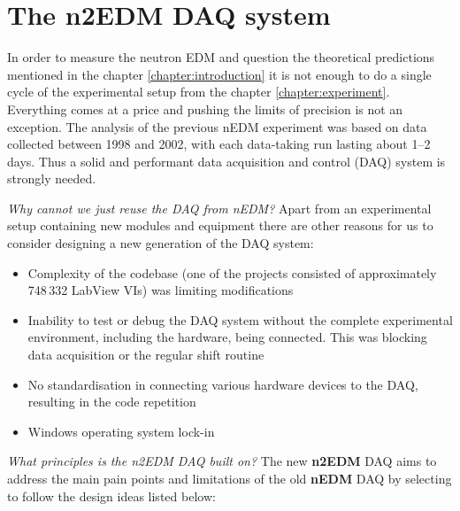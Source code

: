 \chapter{The n2EDM DAQ system}
\label{chapter:daq}

In order to measure the neutron EDM and question the theoretical predictions mentioned in the chapter \ref{chapter:introduction} it is not enough to do a single cycle of the experimental setup from the chapter \ref{chapter:experiment}. Everything comes at a price and pushing the limits of precision is not an exception. The analysis \cite{Pendlebury2004} of the previous nEDM experiment was based on data collected between 1998 and 2002, with each data-taking run lasting about 1--2 days. Thus a solid and performant data acquisition and control (DAQ) system is strongly needed.

\textit{Why cannot we just reuse the DAQ from nEDM?} Apart from an experimental setup containing new modules and equipment there are \cite{Bison2018} other reasons for us to consider designing a new generation of the DAQ system:

\begin{itemize}
	\item Complexity of the codebase (one of the projects consisted of approximately 748\,332 LabView VIs) was limiting modifications
	\item Inability to test or debug the DAQ system without the complete experimental environment, including the hardware, being connected. This was blocking data acquisition or the regular shift routine
	\item No standardisation in connecting various hardware devices to the DAQ, resulting in the code repetition
	\item Windows operating system lock-in
\end{itemize}

\textit{What principles is the n2EDM DAQ built on?} The new \textbf{n2EDM} DAQ aims to address the main pain points and limitations of the old \textbf{nEDM} DAQ by selecting to follow the design ideas listed below:

